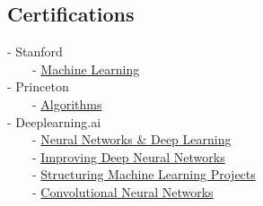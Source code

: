 \documentclass[]{bigfatnoob-resume}
\begin{document}
\begin{minipage}[t]{0.33\textwidth}
\subsection{Certifications}
- Stanford \\
\ \ \ \ - \href{https://github.com/bigfatnoob/bigfatnoob.github.io/blob/master/other-files/certifications/ML.pdf}{Machine Learning} \\
- Princeton \\
\ \ \ \ - \href{https://github.com/bigfatnoob/bigfatnoob.github.io/blob/master/other-files/certifications/Algorithms1.pdf}{Algorithms}\\
- Deeplearning.ai \\
\ \ \ \ - \href{https://github.com/bigfatnoob/bigfatnoob.github.io/blob/master/other-files/certifications/DL1.pdf}{Neural Networks \& Deep Learning}\\
\ \ \ \ - \href{https://github.com/bigfatnoob/bigfatnoob.github.io/blob/master/other-files/certifications/DL2.pdf}{Improving Deep Neural Networks}\\
\ \ \ \ - \href{https://github.com/bigfatnoob/bigfatnoob.github.io/blob/master/other-files/certifications/DL3.pdf}{Structuring Machine Learning Projects}\\
\ \ \ \ - \href{https://github.com/bigfatnoob/bigfatnoob.github.io/blob/master/other-files/certifications/DL4.pdf}{Convolutional Neural Networks}\\
\sectionsep


%
%

\end{minipage} 
\hfill
\end{document}
